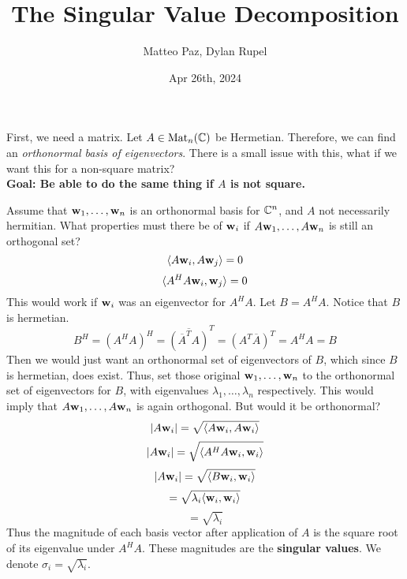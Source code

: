 \documentclass{article}
\author{Matteo Paz, Dylan Rupel}
\date{Apr 26th, 2024}
\title{The Singular Value Decomposition}
\begin{document}
    \maketitle{}
    \noindent

    First, we need a matrix. Let $A \in \operatorname{Mat}_n(\mathbb{C})$ be Hermetian. Therefore, we can find an \emph{orthonormal basis of eigenvectors}. There is a small issue with this, what if we want this for a non-square matrix? \\
    \textbf{Goal: Be able to do the same thing if $A$ is not square.} \vspace{1em}

    Assume that $\mathbf{w}_1, \ldots, \mathbf{w}_n$ is an orthonormal basis for $\mathbb{C}^n$, and $A$ not necessarily hermitian. What properties must there be of $\mathbf{w}_i$ if $A\mathbf{w}_1, \ldots, A\mathbf{w}_n$ is still an orthogonal set?
    \[\langle A\mathbf{w}_i, A\mathbf{w}_j \rangle = 0\]
    \[\langle A^H A\mathbf{w}_i, \mathbf{w}_j \rangle = 0\]
    This would work if $\mathbf{w}_i$ was an eigenvector for $A^H A$. Let $B = A^H A$. Notice that $B$ is hermetian.
    \[B^H = (A^H A)^H = \overline{(\overline{A}^T A)}^T = (A^T \overline{A})^T = A^H A = B\]
    Then we would just want an orthonormal set of eigenvectors of $B$, which since $B$ is hermetian, does exist. Thus, set those original $\mathbf{w}_1, \ldots, \mathbf{w}_n$ to the orthonormal set of eigenvectors for $B$, with eigenvalues $\lambda_1, \ldots, \lambda_n$ respectively. This would imply that $A\mathbf{w}_1, \ldots, A\mathbf{w}_n$ is again orthogonal. But would it be orthonormal?
    \[|A\mathbf{w}_i| = \sqrt{\langle A\mathbf{w}_i, A\mathbf{w}_i \rangle}\]
    \[|A\mathbf{w}_i| = \sqrt{\langle A^H A\mathbf{w}_i, \mathbf{w}_i \rangle}\]
    \[|A\mathbf{w}_i| = \sqrt{\langle B\mathbf{w}_i, \mathbf{w}_i \rangle}\]
    \[= \sqrt{\lambda_i \langle \mathbf{w}_i, \mathbf{w}_i \rangle}\]
    \[= \sqrt{\lambda_i}\]
    Thus the magnitude of each basis vector after application of $A$ is the square root of its eigenvalue under $A^H A$. These magnitudes are the \textbf{singular values}. We denote $\sigma_i = \sqrt{\lambda_i}$. \vspace{1em}
\end{document}
